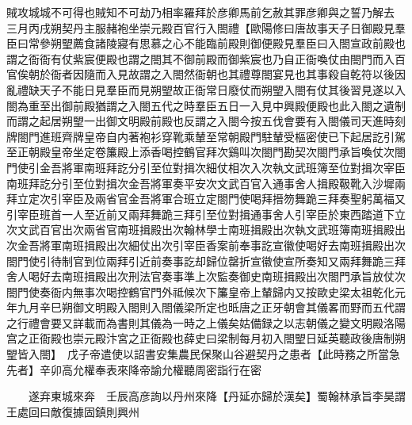 賊攻城城不可得也賊知不可劫乃相率羅拜於彦卿馬前乞赦其罪彦卿與之誓乃解去　三月丙戌朔契丹主服赭袍坐崇元殿百官行入閤禮【歐陽修曰唐故事天子日御殿見羣臣曰常參朔朢薦食諸陵寢有思慕之心不能臨前殿則御便殿見羣臣曰入閤宣政前殿也謂之衙衙有仗紫宸便殿也謂之閤其不御前殿而御紫宸也乃自正衙喚仗由閤門而入百官俟朝於衙者因隨而入見故謂之入閤然衙朝也其禮尊閤宴見也其事殺自乾符以後因亂禮缺天子不能日見羣臣而見朔朢故正衙常日廢仗而朔朢入閤有仗其後習見遂以入閤為重至出御前殿猶謂之入閤五代之時羣臣五日一入見中興殿便殿也此入閤之遺制而謂之起居朔朢一出御文明殿前殿也反謂之入閤今按五伐會要有入閤儀司天進時刻牌閤門進班齊牌皇帝自内著袍衫穿靴乘輦至常朝殿門駐輦受樞密使已下起居訖引駕至正朝殿皇帝坐定卷簾殿上添香喝控鶴官拜次鷄叫次閤門勘契次閤門承旨喚仗次閤門使引金吾將軍南班拜訖分引至位對揖次細仗相次入次執文武班簿至位對揖次宰臣南班拜訖分引至位對揖次金吾將軍奏平安次文武百官入通事舍人揖殿靸靴入沙墀兩拜立定次引宰臣及兩省官金吾將軍合班立定閤門使喝拜搢笏舞跪三拜奏聖躬萬福又引宰臣班首一人至近前又兩拜舞跪三拜引至位對揖通事舍人引宰臣於東西踏道下立次文武百官出次兩省官南班揖殿出次翰林學士南班揖殿出次執文武班簿南班揖殿出次金吾將軍南班揖殿出次細仗出次引宰臣香案前奉事訖宣徽使喝好去南班揖殿出次閤門使引待制官到位兩拜引近前奏事訖却歸位罄折宣徽使宣所奏知又兩拜舞跪三拜舍人喝好去南班揖殿出次刑法官奏事準上次監奏御史南班揖殿出次閤門承旨放仗次閤門使奏衙内無事次喝控鶴官門外祗候次下簾皇帝上輦歸内又按歐史梁太祖乾化元年九月辛巳朔御文明殿入閤則入閤儀梁所定也㫝唐之正牙朝會其儀畧而野而五代謂之行禮會要又詳載而為書則其儀為一時之上儀矣姑備録之以志朝儀之變文明殿洛陽宫之正衙殿也崇元殿汴宮之正衙殿也薛史曰梁制每月初入閤朢日延英聽政後唐制朔朢皆入閤】　戊子帝遣使以詔書安集農民保聚山谷避契丹之患者【此時務之所當急先者】辛卯高允權奉表來降帝諭允權聽周密詣行在密

　　遂弃東城來奔　壬辰高彦詢以丹州來降【丹延亦歸於漢矣】蜀翰林承旨李昊謂王處回曰敵復據固鎮則興州

